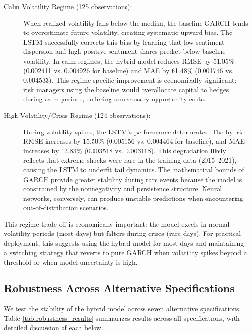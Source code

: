 \begin{description}
    \item[Calm Volatility Regime (125 observations):] When realized volatility falls below the median, the baseline GARCH tends to overestimate future volatility, creating systematic upward bias. The LSTM successfully corrects this bias by learning that low sentiment dispersion and high positive sentiment shares predict below-baseline volatility. In calm regimes, the hybrid model reduces RMSE by 51.05\% (0.002411 vs. 0.004926 for baseline) and MAE by 61.48\% (0.001746 vs. 0.004533). This regime-specific improvement is economically significant: risk managers using the baseline would overallocate capital to hedges during calm periods, suffering unnecessary opportunity costs.
    
    \item[High Volatility/Crisis Regime (124 observations):] During volatility spikes, the LSTM's performance deteriorates. The hybrid RMSE increases by 15.50\% (0.005156 vs. 0.004464 for baseline), and MAE increases by 12.83\% (0.003518 vs. 0.003118). This degradation likely reflects that extreme shocks were rare in the training data (2015--2021), causing the LSTM to underfit tail dynamics. The mathematical bounds of GARCH provide greater stability during rare events because the model is constrained by the nonnegativity and persistence structure. Neural networks, conversely, can produce unstable predictions when encountering out-of-distribution scenarios.
\end{description}

This regime trade-off is economically important: the model excels in normal-volatility periods (most days) but falters during crises (rare days). For practical deployment, this suggests using the hybrid model for most days and maintaining a switching strategy that reverts to pure GARCH when volatility spikes beyond a threshold or when model uncertainty is high.

\subsection{Robustness Across Alternative Specifications}

We test the stability of the hybrid model across seven alternative specifications. Table \ref{tab:robustness_results} summarizes results across all specifications, with detailed discussion of each below.

